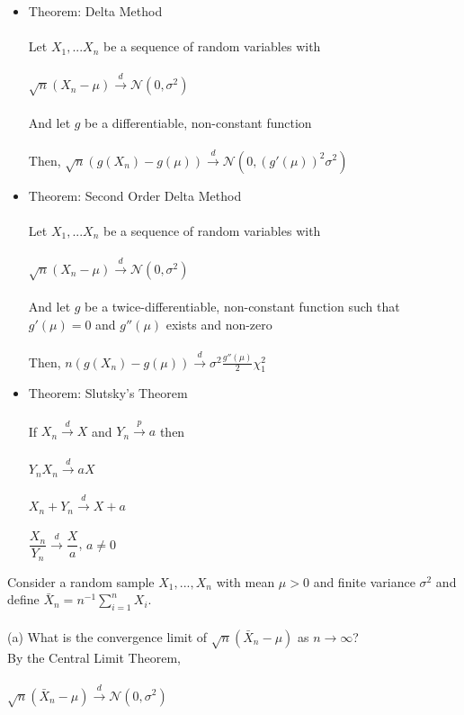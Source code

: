 \documentclass{article}
\begin{document}
\begin{itemize}
    \item Theorem: Delta Method\\\\
    Let $X_1,...X_n$ be a sequence of random variables with\\\\
    $\sqrt{n}(X_n-\mu)\xrightarrow{d}\mathcal{N}(0,\sigma^2)$\\\\
    And let $g$ be a differentiable, non-constant function\\\\
    Then, $\sqrt{n}(g(X_n)-g(\mu))\xrightarrow{d}\mathcal{N}(0,(g'(\mu))^2\sigma^2)$\\
    \item Theorem: Second Order Delta Method\\\\
    Let $X_1,...X_n$ be a sequence of random variables with\\\\
    $\sqrt{n}(X_n-\mu)\xrightarrow{d}\mathcal{N}(0,\sigma^2)$\\\\
    And let $g$ be a twice-differentiable, non-constant function such that\\
    $g'(\mu)=0$ and $g''(\mu)$ exists and non-zero\\\\
    Then, $n(g(X_n)-g(\mu))\xrightarrow{d}\sigma^2\frac{g''(\mu)}{2}\chi^2_1$\\
    \item Theorem: Slutsky's Theorem\\\\
    If $X_n\xrightarrow{d}X$ and $Y_n\xrightarrow{p}a$ then\\\\
    $Y_nX_n\xrightarrow{d}aX$\\\\
    $X_n+Y_n\xrightarrow{d}X+a$\\\\
    $\dfrac{X_n}{Y_n}\xrightarrow{d}\dfrac{X}{a}$, $a\neq0$
\end{itemize}
Consider a random sample $X_1,...,X_n$ with mean $\mu>0$ and finite variance $\sigma^2$ and define $\bar{X}_n=n^{-1}\sum_{i=1}^nX_i$.\\\\
(a) What is the convergence limit of $\sqrt{n}(\bar{X}_n-\mu)$ as $n\rightarrow\infty$?\\
By the Central Limit Theorem,\\\\ $\sqrt{n}(\bar{X}_n-\mu)\xrightarrow{d}\mathcal{N}(0,\sigma^2)$\\\\
\end{document}
